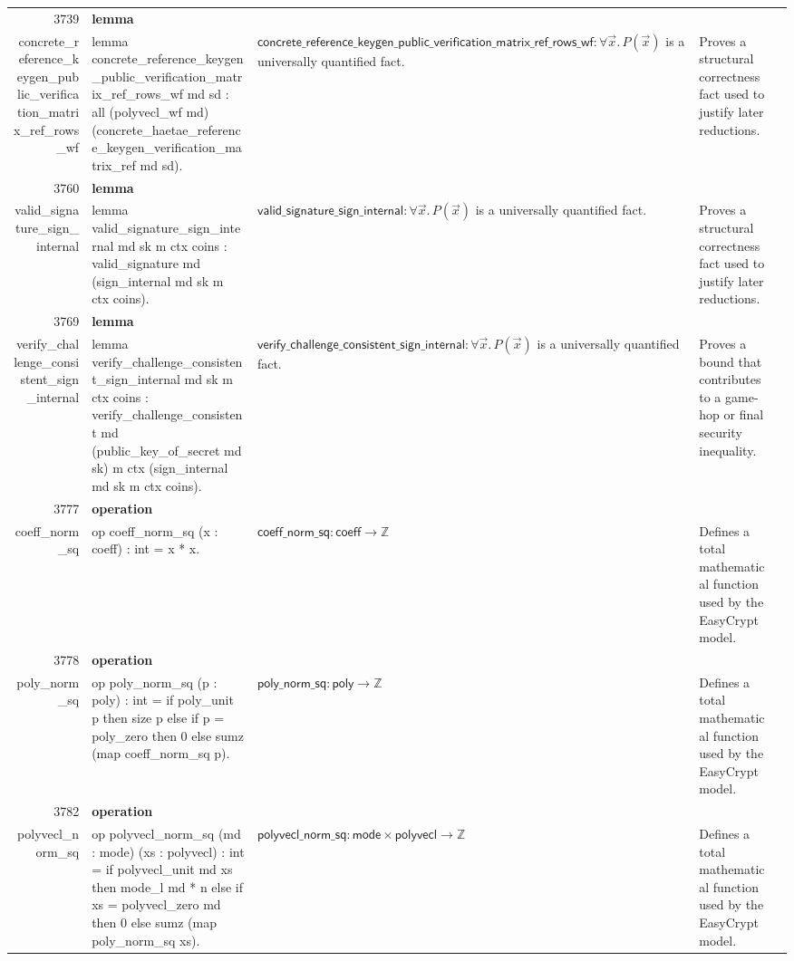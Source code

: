 \documentclass[10pt]{article}
\newcommand{\ec}[1]{\begingroup\ttfamily\scriptsize #1\endgroup}
\begin{document}
\begin{longtable}{r L{0.17\textwidth} L{0.26\textwidth} L{0.27\textwidth} L{0.20\textwidth}}
3739 & \textbf{lemma}\\\ec{concrete\_reference\_keygen\_public\_verification\_matrix\_ref\_rows\_wf} & \ec{lemma concrete\_reference\_keygen\_public\_verification\_matrix\_ref\_rows\_wf md sd : all (polyvecl\_wf md) (concrete\_haetae\_reference\_keygen\_verification\_matrix\_ref md sd).} & \(\mathsf{concrete\_reference\_keygen\_public\_verification\_matrix\_ref\_rows\_wf} : \forall \vec{x}.\, P(\vec{x})\) is a universally quantified fact. & Proves a structural correctness fact used to justify later reductions. \\
3760 & \textbf{lemma}\\\ec{valid\_signature\_sign\_internal} & \ec{lemma valid\_signature\_sign\_internal md sk m ctx coins : valid\_signature md (sign\_internal md sk m ctx coins).} & \(\mathsf{valid\_signature\_sign\_internal} : \forall \vec{x}.\, P(\vec{x})\) is a universally quantified fact. & Proves a structural correctness fact used to justify later reductions. \\
3769 & \textbf{lemma}\\\ec{verify\_challenge\_consistent\_sign\_internal} & \ec{lemma verify\_challenge\_consistent\_sign\_internal md sk m ctx coins : verify\_challenge\_consistent md (public\_key\_of\_secret md sk) m ctx (sign\_internal md sk m ctx coins).} & \(\mathsf{verify\_challenge\_consistent\_sign\_internal} : \forall \vec{x}.\, P(\vec{x})\) is a universally quantified fact. & Proves a bound that contributes to a game-hop or final security inequality. \\
3777 & \textbf{operation}\\\ec{coeff\_norm\_sq} & \ec{op coeff\_norm\_sq (x : coeff) : int = x * x.} & \(\mathsf{coeff\_norm\_sq} : \mathsf{coeff} \to \mathbb{Z}\) & Defines a total mathematical function used by the EasyCrypt model. \\
3778 & \textbf{operation}\\\ec{poly\_norm\_sq} & \ec{op poly\_norm\_sq (p : poly) : int = if poly\_unit p then size p else if p = poly\_zero then 0 else sumz (map coeff\_norm\_sq p).} & \(\mathsf{poly\_norm\_sq} : \mathsf{poly} \to \mathbb{Z}\) & Defines a total mathematical function used by the EasyCrypt model. \\
3782 & \textbf{operation}\\\ec{polyvecl\_norm\_sq} & \ec{op polyvecl\_norm\_sq (md : mode) (xs : polyvecl) : int = if polyvecl\_unit md xs then mode\_l md * n else if xs = polyvecl\_zero md then 0 else sumz (map poly\_norm\_sq xs).} & \(\mathsf{polyvecl\_norm\_sq} : \mathsf{mode} \times \mathsf{polyvecl} \to \mathbb{Z}\) & Defines a total mathematical function used by the EasyCrypt model. \\

\end{longtable}
\end{document}
